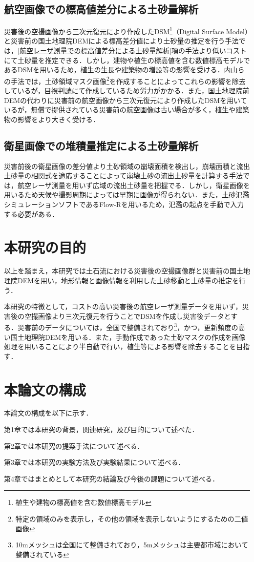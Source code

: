     \subsection{航空画像での標高値差分による土砂量解析}
      災害後の空撮画像から三次元復元により作成したDSM\footnote{植生や建物の標高値を含む数値標高モデル}（Digital Surface Model）と災害前の国土地理院DEM\cite{基盤地図情報}による標高差分値により土砂量の推定を行う手法\cite{土砂量解析3}では，\ref{航空レーザ測量での標高値差分による土砂量解析}項の手法より低いコストにて土砂量を推定できる．しかし，建物や植生の標高値を含む数値標高モデルであるDSMを用いるため，植生の生長や建築物の増設等の影響を受ける．内山らの手法\cite{土砂量解析4}では，土砂領域マスク画像\footnote{特定の領域のみを表示し，その他の領域を表示しないようにするための二値画像}を作成することによってこれらの影響を除去しているが，目視判読にて作成しているため労力がかかる．また，国土地理院前DEMの代わりに災害前の航空画像から三次元復元により作成したDSMを用いているが，無償で提供されている災害前の航空画像は古い場合が多く，植生や建築物の影響をより大きく受ける．


    \subsection{衛星画像での堆積量推定による土砂量解析}
      災害前後の衛星画像の差分値より土砂領域の崩壊面積を検出し，崩壊面積と流出土砂量の相関式を適応することによって崩壊土砂の流出土砂量を計算する手法\cite{土砂量解析5}では，航空レーザ測量を用いず広域の流出土砂量を把握でる．しかし，衛星画像を用いるため天候や撮影周期によっては早期に画像が得られない．また，土砂氾濫シミュレーションソフトであるFlow-R\cite{Flow-R}を用いるため，氾濫の起点を手動で入力する必要がある．



  \section{本研究の目的}
    以上を踏まえ，本研究では土石流における災害後の空撮画像群と災害前の国土地理院DEMを用い，地形情報と画像情報を利用した土砂移動と土砂量の推定を行う．
    
    本研究の特徴として，コストの高い災害後の航空レーザ測量データを用いず，災害後の空撮画像より三次元復元を行うことでDSMを作成し災害後データとする．災害前のデータについては，全国で整備されており\footnote{10mメッシュは全国にて整備されており，5mメッシュは主要都市域において整備されている}，かつ，更新頻度の高い国土地理院DEMを用いる．また，手動作成であった土砂マスクの作成を画像処理を用いることにより半自動で行い，植生等による影響を除去することを目指す．



  \section{本論文の構成}
    本論文の構成を以下に示す．
    
    第1章では本研究の背景，関連研究，及び目的について述べた．

    第2章では本研究の提案手法について述べる．

    第3章では本研究の実験方法及び実験結果について述べる．

    第4章ではまとめとして本研究の結論及び今後の課題について述べる．
